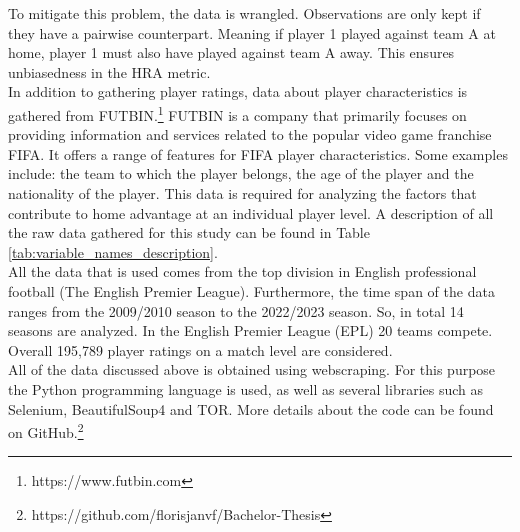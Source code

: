 \noindent
To mitigate this problem, the data is wrangled. Observations are only kept if they have a pairwise counterpart. Meaning if player 1 played against team A at home, player 1 must also have played against team A away. This ensures unbiasedness in the HRA metric. \\

\noindent
In addition to gathering player ratings, data about player characteristics is gathered from FUTBIN.\footnote{https://www.futbin.com} FUTBIN is a company that primarily focuses on providing information and services related to the popular video game franchise FIFA. It offers a range of features for FIFA player characteristics. Some examples include: the team to which the player belongs, the age of the player and the nationality of the player. This data is required for analyzing the factors that contribute to home advantage at an individual player level. A description of all the raw data gathered for this study can be found in Table \ref{tab:variable_names_description}. \\

\noindent
All the data that is used comes from the top division in English professional football (The English Premier League). Furthermore, the time span of the data ranges from the 2009/2010 season to the 2022/2023 season. So, in total 14 seasons are analyzed. In the English Premier League (EPL) 20 teams compete. Overall 195,789 player ratings on a match level are considered. \\

\noindent
All of the data discussed above is obtained using webscraping. For this purpose the Python programming language is used, as well as several libraries such as Selenium, BeautifulSoup4 and TOR. More details about the code can be found on GitHub.\footnote{https://github.com/florisjanvf/Bachelor-Thesis}

